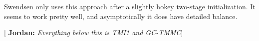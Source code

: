 \documentclass[letterpaper,twocolumn,amsmath,amssymb,pre,aps,10pt]{revtex4-1}
\newcommand{\blue}[1]{{\bf \color{blue} #1}}
\newcommand{\jpsays}[1]{{\color{red} [\blue{Jordan:} \emph{#1}]}}
\begin{document}
Swendsen only uses this approach after a slightly hokey two-stage
initialization.  It seems to work pretty well, and asymptotically it
does have detailed balance.

\newpage
\jpsays{Everything below this is TMI1 and GC-TMMC}
\subsection{}





\end{document}
